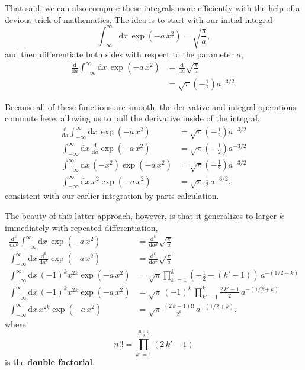\documentclass[
  letterpaper,
  DIV=11,
  numbers=noendperiod]{scrartcl}
\begin{document}
That said, we can also compute these integrals more efficiently with the
help of a devious trick of mathematics. The idea is to start with our
initial integral \[
\int_{-\infty}^{\infty} \mathrm{d} x \, \exp \left( -a \, x^{2} \right)
=
\sqrt{ \frac{\pi}{a} },
\] and then differentiate both sides with respect to the parameter
\(a\), \begin{align*}
\frac{\mathrm{d}}{\mathrm{d} a}
\int_{-\infty}^{\infty} \mathrm{d} x \, \exp \left( -a \, x^{2} \right)
&=
\frac{\mathrm{d}}{\mathrm{d} a}
\sqrt{ \frac{\pi}{a} }
\\
&=
\sqrt{\pi} \left( - \frac{1}{2} \right) a^{-3/2}.
\end{align*}

Because all of these functions are smooth, the derivative and integral
operations commute here, allowing us to pull the derivative inside of
the integral, \begin{align*}
\frac{\mathrm{d}}{\mathrm{d} a }
\int_{-\infty}^{\infty} \mathrm{d} x \,
\exp \left( -a \, x^{2} \right)
&=
\sqrt{\pi} \left( - \frac{1}{2} \right) a^{-3/2}
\\
\int_{-\infty}^{\infty} \mathrm{d} x \,
\frac{\mathrm{d}}{\mathrm{d} a} \exp \left( -a \, x^{2} \right)
&=
\sqrt{\pi} \left( - \frac{1}{2} \right) a^{-3/2}
\\
\int_{-\infty}^{\infty} \mathrm{d} x \,
\left( -x^{2} \right) \exp \left( -a \, x^{2} \right)
&=
\sqrt{\pi} \left( - \frac{1}{2} \right) a^{-3/2}
\\
\int_{-\infty}^{\infty} \mathrm{d} x \,
x^{2} \exp \left( -a \, x^{2} \right)
&=
\sqrt{\pi} \, \frac{1}{2} \, a^{-3/2},
\end{align*} consistent with our earlier integration by parts
calculation.

The beauty of this latter approach, however, is that it generalizes to
larger \(k\) immediately with repeated differentiation, \begin{align*}
\frac{\mathrm{d}^{k}}{\mathrm{d} a^{k}}
\int_{-\infty}^{\infty} \mathrm{d} x \,
\exp \left( -a \, x^{2} \right)
&=
\frac{\mathrm{d}^{k}}{\mathrm{d} a^{k}}
\sqrt{ \frac{\pi}{a} }
\\
\int_{-\infty}^{\infty} \mathrm{d} x \,
\frac{\mathrm{d}^{k}}{\mathrm{d} a^{k}}
\exp \left( -a \, x^{2} \right)
&=
\frac{\mathrm{d}^{k}}{\mathrm{d} a^{k}}
\sqrt{ \frac{\pi}{a} }
\\
\int_{-\infty}^{\infty} \mathrm{d} x \,
(-1)^{k} x^{2 k} \exp \left( -a \, x^{2} \right)
&=
\sqrt{\pi}
\prod_{k' = 1}^{k} \left(-\frac{1}{2} - (k' - 1) \right)
\, a^{-(1/2 + k)}
\\
\int_{-\infty}^{\infty} \mathrm{d} x \,
(-1)^{k} x^{2 k} \exp \left( -a \, x^{2} \right)
&=
\sqrt{\pi} \, (-1)^{k} \,
\prod_{k' = 1}^{k} \frac{2 \, k' - 1}{2} \,
a^{-(1/2 + k)}
\\
\int_{-\infty}^{\infty} \mathrm{d} x \,
x^{2 k} \exp \left( -a \, x^{2} \right)
&=
\sqrt{\pi} \, \frac{ (2 \, k - 1)!! }{2^{k}} \, a^{-(1/2 + k)},
\end{align*} where \[
n!! = \prod_{k' = 1}^{\frac{n + 1}{2}} (2 \, k' - 1)
\] is the \textbf{double factorial}.
\end{document}
